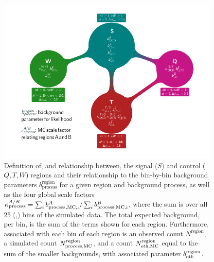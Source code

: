 \begin{figure}[p]
  \centering
  \includegraphics[width=\textwidth]{figures/razor_strategy/BoostFlowChart_noZ}
  \caption{Definition of, and relationship between, the signal ($S$) and control ($Q,T,W$) regions
and their relationship to the bin-by-bin background parameters
$b^{\textrm{region}}_{\textrm{process}}$ for a given region and background process, as well as the
four global scale factors $\kappa^{A/B}_{\textrm{process}} = \sum_i b^A_{\rm process, MC, i} /
\sum_i b^B_{\rm process, MC, i}$, where the sum is over all 25 (\mr,\rsq) bins of the simulated
data. 
The total expected background, per bin, is the sum of the terms shown for each region. Furthermore,
associated with each bin of each region is an observed count $N^{\textrm{region}}$, a simulated
count $N^{\textrm{region}}_{\rm process, MC}$, and a count $N^{\textrm{region}}_{\rm oth, MC}$
equal to the sum of the smaller backgrounds, with associated parameter
$b^{\textrm{region}}_{\rm oth}$.
  \label{fig:boost_flowchart}}
\end{figure}



